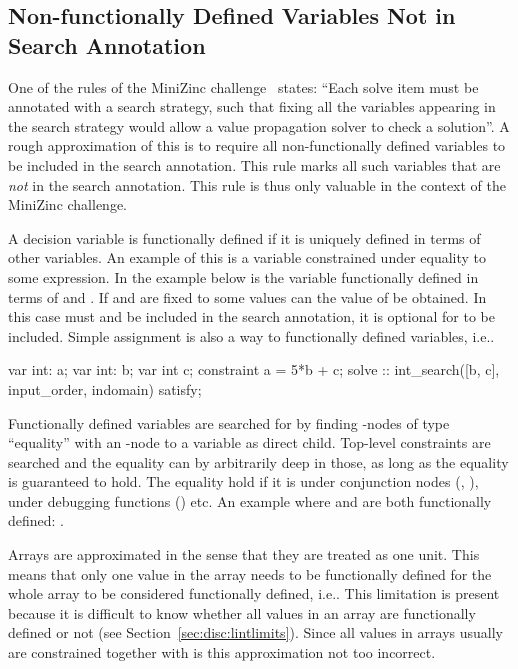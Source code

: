 \documentclass[a4paper,12pt]{article}
\begin{document}
\subsection{Non-functionally Defined Variables Not in Search Annotation}\label{sec:rule:nonfuncdef}
One of the rules of the MiniZinc challenge~\cite{MZN:Challenge} states: ``Each solve item
must be annotated with a search strategy, such that fixing all the variables appearing in
the search strategy would allow a value propagation solver to check a solution''. A rough
approximation of this is to require all non-functionally defined variables to be included
in the search annotation. This rule marks all such variables that are \emph{not} in the
search annotation. This rule is thus only valuable in the context of the MiniZinc
challenge.

A decision variable is functionally defined if it is uniquely defined in terms of other
variables. An example of this is a variable constrained under equality to some expression.
In the example below is the variable  functionally defined in terms of  and .
If  and  are fixed to some values can the value of  be obtained. In this
case must  and  be included in the search annotation, it is optional for
 to be included.
Simple assignment is also a way to functionally defined variables, i.e.\@ {}.
\begin{mznnobreak}
var int: a; var int: b; var int c;
constraint a = 5*b + c;
solve
  :: int_search([b, c], input_order, indomain)
  satisfy;
\end{mznnobreak}

Functionally defined variables are searched for by finding -nodes of type
``equality'' with an -node to a variable as direct child. Top-level constraints
are searched and the equality can by arbitrarily deep in those, as long as the equality is
guaranteed to hold. The equality hold if it is under conjunction nodes (\mi{/\\},
), under debugging functions () etc. An example where  and
 are both functionally defined: .

Arrays are approximated in the sense that they are treated as one unit. This means that
only one value in the array needs to be functionally defined for the whole array to be
considered functionally defined, i.e.\@ {}. This limitation is present because
it is difficult to know whether all values in an array are functionally defined or not
(see Section~\ref{sec:disc:lintlimits}). Since all values in arrays usually are
constrained together with  is this approximation not too incorrect.
\end{document}
